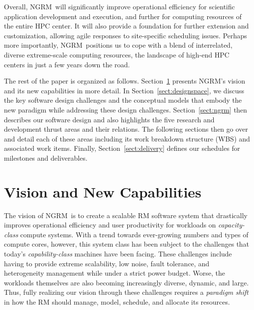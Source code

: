 \documentclass{article}
\newcommand{\ngrm}{NGRM}
\begin{document}
Overall, \ngrm\ will significantly improve operational efficiency for
scientific application development and execution, and further for computing
resources of the entire HPC center.  It will also provide
a foundation for further extension and customization, allowing agile responses
to site-specific scheduling issues. Perhaps more importantly, \ngrm\
positions us to cope with a blend of interrelated, diverse
extreme-scale computing resources, the landscape of high-end HPC centers
in just a few years down the road.

The rest of the paper is organized as follows.
Section~\ref{sect:vision} presents \ngrm's vision and 
its new capabilities in more detail. 
In Section~\ref{sect:designspace}, we discuss 
the key software design challenges and the conceptual models
that embody the new paradigm while addressing these design challenges. 
Section~\ref{sect:ngrm} then describes our software design
and also highlights the five research and development thrust areas
and their relations. 
The following sections then go over and detail each of these areas including 
its work breakdown structure (WBS) and associated work items.
Finally, Section~\ref{sect:delivery} defines
our schedules for milestones and deliverables.


\section{Vision and New Capabilities}
\label{sect:vision}

The vision of \ngrm\ is to create a scalable RM software system that 
drastically improves operational efficiency and user productivity 
for workloads on {\em capacity-class} compute systems.
With a trend towards ever-growing numbers and types of compute cores, however,
this system class has been subject to the challenges that
today's {\em capability-class} machines have been facing. 
These challenges include having to provide extreme scalability, low noise, 
fault tolerance, and heterogeneity management while under a strict power budget.
Worse, the workloads themselves are also becoming increasingly diverse, 
dynamic, and large. Thus, fully realizing our vision through these challenges requires
a {\em paradigm shift} in how the RM should manage, model, schedule,
and allocate its resources.
\end{document}
